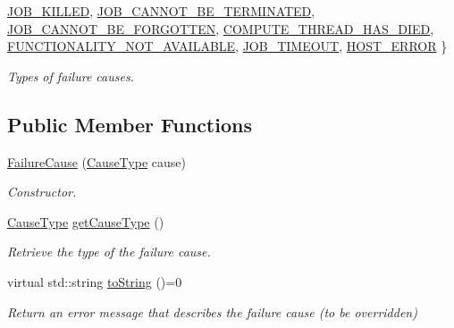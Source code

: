 \begin{DoxyCompactItemize}
\hyperlink{classwrench_1_1_failure_cause_a6d06d6845ca5499c5cbbd9e1a08c9c77ae26e9df054dd1df285e7d0ab8f350869}{J\+O\+B\+\_\+\+K\+I\+L\+L\+ED}, 
\hyperlink{classwrench_1_1_failure_cause_a6d06d6845ca5499c5cbbd9e1a08c9c77af3188a3cd262d0ef0e0b985c0f3bc93d}{J\+O\+B\+\_\+\+C\+A\+N\+N\+O\+T\+\_\+\+B\+E\+\_\+\+T\+E\+R\+M\+I\+N\+A\+T\+ED}, 
\hyperlink{classwrench_1_1_failure_cause_a6d06d6845ca5499c5cbbd9e1a08c9c77ae4e51f06537ecc8ab4f7a5b3a890b2a5}{J\+O\+B\+\_\+\+C\+A\+N\+N\+O\+T\+\_\+\+B\+E\+\_\+\+F\+O\+R\+G\+O\+T\+T\+EN}, 
\hyperlink{classwrench_1_1_failure_cause_a6d06d6845ca5499c5cbbd9e1a08c9c77a709b0b9c94851003622d5ec900f186f6}{C\+O\+M\+P\+U\+T\+E\+\_\+\+T\+H\+R\+E\+A\+D\+\_\+\+H\+A\+S\+\_\+\+D\+I\+ED}, 
\newline
\hyperlink{classwrench_1_1_failure_cause_a6d06d6845ca5499c5cbbd9e1a08c9c77a362e54af1fdb80512e4708504105d8c0}{F\+U\+N\+C\+T\+I\+O\+N\+A\+L\+I\+T\+Y\+\_\+\+N\+O\+T\+\_\+\+A\+V\+A\+I\+L\+A\+B\+LE}, 
\hyperlink{classwrench_1_1_failure_cause_a6d06d6845ca5499c5cbbd9e1a08c9c77a60d4bf28e7842c657ebe0c429b32f423}{J\+O\+B\+\_\+\+T\+I\+M\+E\+O\+UT}, 
\hyperlink{classwrench_1_1_failure_cause_a6d06d6845ca5499c5cbbd9e1a08c9c77ac063809cfa1d103f49dd7d25939a54d4}{H\+O\+S\+T\+\_\+\+E\+R\+R\+OR}
 \}\begin{DoxyCompactList}\small\item\em Types of failure causes. \end{DoxyCompactList}
\end{DoxyCompactItemize}
\subsection*{Public Member Functions}
\begin{DoxyCompactItemize}
\item 
\hyperlink{classwrench_1_1_failure_cause_ac18f4c292fbdc1878da7ae2431c7d3e4}{Failure\+Cause} (\hyperlink{classwrench_1_1_failure_cause_a6d06d6845ca5499c5cbbd9e1a08c9c77}{Cause\+Type} cause)
\begin{DoxyCompactList}\small\item\em Constructor. \end{DoxyCompactList}\item 
\hyperlink{classwrench_1_1_failure_cause_a6d06d6845ca5499c5cbbd9e1a08c9c77}{Cause\+Type} \hyperlink{classwrench_1_1_failure_cause_a24fa4deecfa2e5e187f8d88187b8dddb}{get\+Cause\+Type} ()
\begin{DoxyCompactList}\small\item\em Retrieve the type of the failure cause. \end{DoxyCompactList}\item 
virtual std\+::string \hyperlink{classwrench_1_1_failure_cause_afbad248ebe902409f2cd4f1d6f2b867d}{to\+String} ()=0
\begin{DoxyCompactList}\small\item\em Return an error message that describes the failure cause (to be overridden) \end{DoxyCompactList}\end{DoxyCompactItemize}


